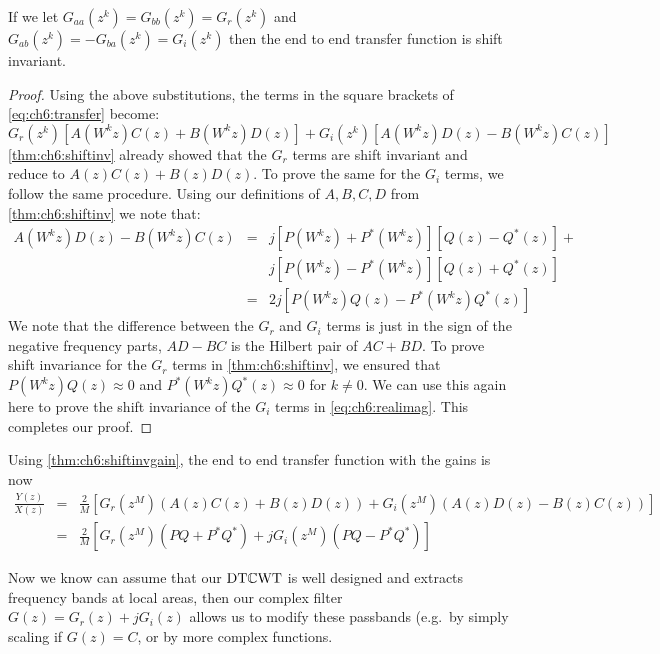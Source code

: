 \begin{theorem}\label{thm:ch6:shiftinvgain}
  If we let $G_{aa}(z^k) = G_{bb}(z^k) = G_r(z^k)$ and $G_{ab}(z^k) = -G_{ba}(z^k) = G_i(z^k)$
  then the end to end transfer function is shift invariant.
\end{theorem}
\begin{proof}
  Using the above substitutions, the terms in the square brackets of
  \eqref{eq:ch6:transfer} become:
  \begin{equation}\label{eq:ch6:realimag}
    G_r(z^k)\left[A(W^kz)C(z) + B(W^kz)D(z)\right] + G_i(z^k)\left[A(W^kz)D(z) - B(W^kz)C(z)\right]
  \end{equation}
  \autoref{thm:ch6:shiftinv} already showed that the $G_r$ terms are shift
  invariant and reduce to $A(z)C(z) + B(z)D(z)$. To prove the same for the $G_i$
  terms, we follow the same procedure. Using our definitions of $A, B, C, D$
  from \autoref{thm:ch6:shiftinv} we note that:
  \begin{eqnarray}
    A(W^kz)D(z) - B(W^kz)C(z) &=& j\left[P(W^kz) + P^*(W^kz)\right]\left[Q(z) -Q^*(z)\right] +\\
                              &&j\left[P(W^kz) -P^*(W^kz)\right]\left[Q(z) + Q^*(z)\right] \\
                              &=& 2j\left[P(W^kz)Q(z) - P^*(W^kz)Q^*(z)\right]
  \end{eqnarray}
  We note that the difference
  between the $G_r$ and $G_i$ terms is just in the sign of the negative
  frequency parts, $AD - BC$ is the Hilbert pair of $AC+BD$. To prove shift
  invariance for the $G_r$ terms in \autoref{thm:ch6:shiftinv}, we ensured that
  $P(W^kz)Q(z) \approx 0$ and $P^*(W^kz)Q^*(z) \approx 0$ for $k\neq 0$. We can
  use this again here to prove the shift invariance of the $G_i$ terms in
  \eqref{eq:ch6:realimag}. This completes our proof.
\end{proof}

Using \autoref{thm:ch6:shiftinvgain}, the end to end transfer function with the
gains is now
\begin{eqnarray}
  \frac{Y(z)}{X(z)} &=& \frac{2}{M} \left[G_r(z^{M}) \left(A(z)C(z) + B(z)D(z)\right)
  + G_i(z^{M}) \left(A(z)D(z) - B(z)C(z)\right) \right] \\
  &=& \frac{2}{M}\left[G_r(z^{M}) \left(PQ + P^*Q^*\right)
  + jG_i(z^{M}) \left(PQ - P^*Q^*\right) \right]  \label{eq:ch6:end2end}
\end{eqnarray}

Now we know can assume that our $\mathrm{DT}\mathbb{C}\mathrm{WT}$ is well designed and extracts frequency
bands at local areas, then our complex filter $G(z)=G_r(z) + jG_i(z)$ allows us
to modify these passbands (e.g.\ by simply scaling if $G(z) = C$, or by more
complex functions.



